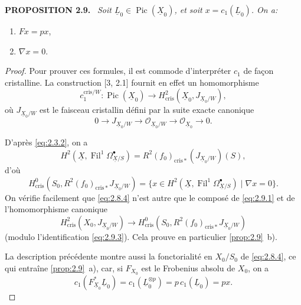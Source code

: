 \documentclass[10pt]{article}
\makeatletter
\DeclareMathOperator{\Pic}{Pic}
\DeclareMathOperator{\Fil}{Fil}
\newcommand{\cris}{\mathrm{cris}}
\newcommand{\UX}{\underline{X}}
\newcommand{\UL}{\underline{L}}
\newcommand{\sourceanchor}[2]{\begingroup\def\@currentlabel{#2}\label{#1}\endgroup}
\newenvironment{sourcestatement}[3]{\par\smallskip\noindent\textbf{#1 #2.}\sourceanchor{#3}{#2}\ \itshape}{\par\normalfont\smallskip}
\makeatother
\begin{document}
\begin{sourcestatement}{PROPOSITION}{2.9}{prop:2.9}
Soit $\UL_0 \in \Pic(\UX_0)$, et soit $x = c_1(\UL_0)$. On a:
\begin{enumerate}[label=\alph*)]
\item $Fx = px$,
\item $\nabla x = 0$.
\end{enumerate}
\end{sourcestatement}

\begin{proof}
Pour prouver ces formules, il est commode d'interpréter $c_1$ de façon cristalline. La construction [3, 2.1] fournit en effet un homomorphisme
\begin{equation}\tag{2.9.1}\label{eq:2.9.1}
c_1^{\cris/W}: \Pic(\UX_0) \to H^2_{\cris}(\UX_0, J_{\UX_0/W}),
\end{equation}
où $J_{\UX_0/W}$ est le faisceau cristallin défini par la suite exacte canonique
\begin{equation}\tag{2.9.2}\label{eq:2.9.2}
0 \to J_{\UX_0/W} \to \mathcal{O}_{\UX_0/W} \to \mathcal{O}_{\UX_0} \to 0.
\end{equation}

D'après \eqref{eq:2.3.2}, on a
\[
H^2(\UX, \Fil^1 \Omega^{\bullet}_{\UX/S}) = R^2(f_0)_{\cris*}(J_{\UX_0/W})(S),
\]
d'où
\begin{equation}\tag{2.9.3}\label{eq:2.9.3}
H^0_{\cris}(S_0, R^2(f_0)_{\cris*} J_{\UX_0/W}) = \{x \in H^2(\UX, \Fil^1 \Omega^{\bullet}_{\UX/S}) \mid \nabla x = 0\}.
\end{equation}
On vérifie facilement que \eqref{eq:2.8.4} n'est autre que le composé de \eqref{eq:2.9.1} et de l'homomorphisme canonique
\begin{equation}\tag{2.9.4}\label{eq:2.9.4}
H^2_{\cris}(X_0, J_{\UX_0/W}) \to H^0_{\cris}(S_0, R^2(f_0)_{\cris*} J_{\UX_0/W})
\end{equation}
(modulo l'identification \eqref{eq:2.9.3}). Cela prouve en particulier \ref{prop:2.9}~b).

La description précédente montre aussi la fonctorialité en $X_0/S_0$ de \eqref{eq:2.8.4}, ce qui entraîne \ref{prop:2.9}~a), car, si $F_{X_0}$ est le Frobenius absolu de $X_0$, on a
\[
c_1(F_{\UX_0}^* \UL_0) = c_1(\UL_0^{\otimes p}) = p\, c_1(\UL_0) = px.
\]\qedhere
\end{proof}
\end{document}
